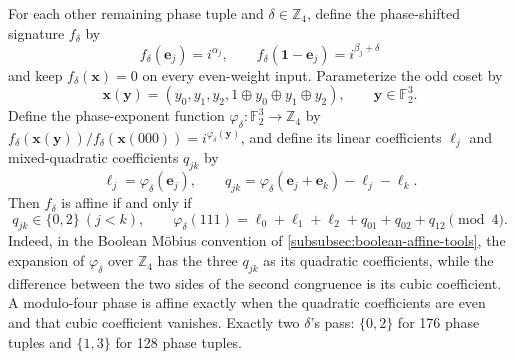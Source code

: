 \documentclass[11pt,letterpaper,onecolumn]{article}
\theoremstyle{plain}
\theoremstyle{definition}
\theoremstyle{remark}
\newcommand{\Ftwo}{\mathbb F_2}
\newcommand{\one}{\mathbf 1}
\begin{document}
For each other remaining phase tuple and \(\delta\in\mathbb Z_4\), define the
phase-shifted signature \(f_\delta\) by
\[
 f_\delta({\mathbf{e}}_j)=i^{\alpha_j},
 \qquad
 f_\delta(\one-{\mathbf{e}}_j)=i^{\beta_j+\delta}
\]
and keep \(f_\delta({\mathbf{x}})=0\) on every even-weight input.  Parameterize the odd
coset by
\[
 {\mathbf{x}}({\mathbf{y}})=(y_0,y_1,y_2,1\oplus y_0\oplus y_1\oplus y_2),
 \qquad {\mathbf{y}}\in\Ftwo^3.
\]
Define the phase-exponent function
\(\varphi_\delta:\Ftwo^3\to\mathbb Z_4\) by
\(f_\delta({\mathbf{x}}({\mathbf{y}}))/f_\delta({\mathbf{x}}(000))=i^{\varphi_\delta({\mathbf{y}})}\), and define its
linear coefficients \(\ell_j\) and mixed-quadratic coefficients \(q_{jk}\)
by
\[
 \ell_j=\varphi_\delta({\mathbf{e}}_j),\qquad
 q_{jk}=\varphi_\delta({\mathbf{e}}_j+{\mathbf{e}}_k)-\ell_j-\ell_k.
\]
Then \(f_\delta\) is affine if and only if
\begin{equation}
 q_{jk}\in\{0,2\}\ (j<k),\qquad
 \varphi_\delta(111)
 =\ell_0+\ell_1+\ell_2+q_{01}+q_{02}+q_{12}\pmod 4.
  \label{eq:cert-mu4-affine-test}
\end{equation}
Indeed, in the Boolean M\"obius convention of
\cref{subsubsec:boolean-affine-tools}, the expansion of
\(\varphi_\delta\) over \(\mathbb Z_4\) has the three
\(q_{jk}\) as its quadratic coefficients, while the difference between the
two sides of the second congruence is its cubic coefficient.  A modulo-four
phase is affine exactly when the quadratic coefficients are even
and that cubic coefficient vanishes.
Exactly two \(\delta\)'s pass: \(\{0,2\}\) for 176 phase tuples and
\(\{1,3\}\) for 128 phase tuples.
\end{document}
